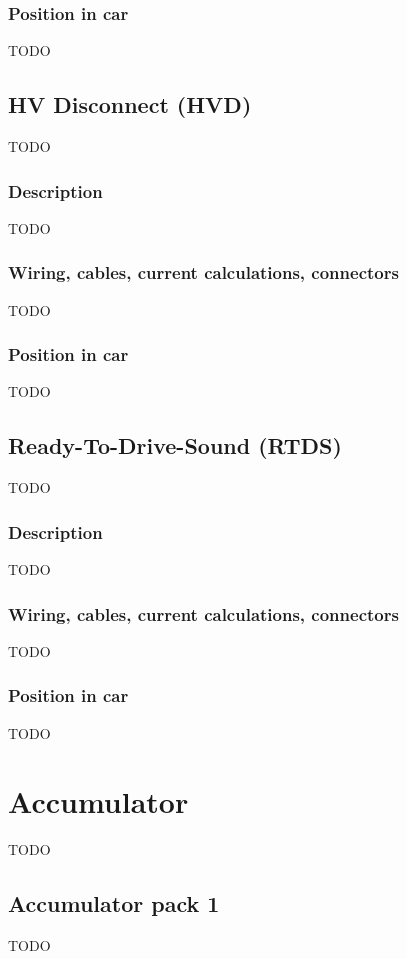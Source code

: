 \documentclass{article}
\begin{document}
\subsubsection{Position in car}
TODO

\subsection{HV Disconnect (HVD)}
TODO

\subsubsection{Description}
TODO

\subsubsection{Wiring, cables, current calculations, connectors}
TODO

\subsubsection{Position in car}
TODO

\subsection{Ready-To-Drive-Sound (RTDS)}
TODO

\subsubsection{Description}
TODO

\subsubsection{Wiring, cables, current calculations, connectors}
TODO

\subsubsection{Position in car}
TODO

\section{Accumulator}
TODO

\subsection{Accumulator pack 1}
TODO
\end{document}
